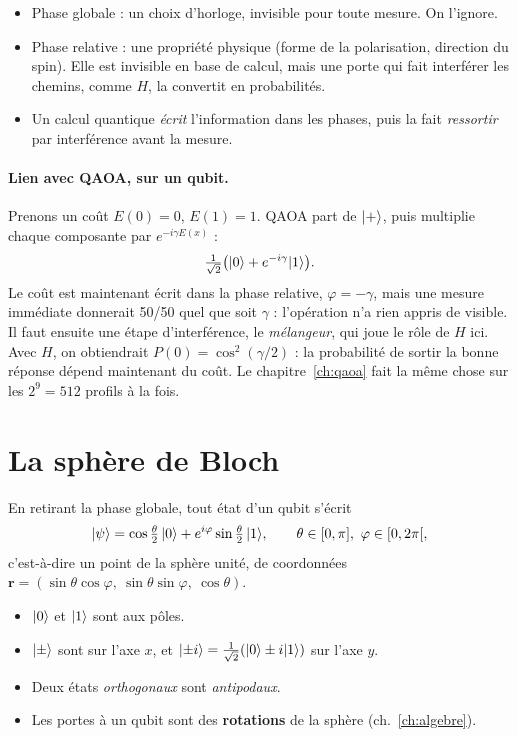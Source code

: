 \begin{resultat}
\begin{itemize}
\item Phase globale : un choix d'horloge, invisible pour toute mesure. On l'ignore.
\item Phase relative : une propriété physique (forme de la polarisation, direction du spin). Elle est invisible en base de calcul, mais une porte qui fait interférer les chemins, comme $H$, la convertit en probabilités.
\item Un calcul quantique \emph{écrit} l'information dans les phases, puis la fait \emph{ressortir} par interférence avant la mesure.
\end{itemize}
\end{resultat}

\paragraph{Lien avec QAOA, sur un qubit.} Prenons un coût $E(0)=0$, $E(1)=1$. QAOA part de $\lvert +\rangle$, puis multiplie chaque composante par $e^{-i\gamma E(x)}$ :
\[
\tfrac1{\sqrt2}\big(\lvert 0\rangle+e^{-i\gamma}\lvert 1\rangle\big).
\]
Le coût est maintenant écrit dans la phase relative, $\varphi=-\gamma$, mais une mesure immédiate donnerait 50/50 quel que soit $\gamma$ : l'opération n'a rien appris de visible. Il faut ensuite une étape d'interférence, le \emph{mélangeur}, qui joue le rôle de $H$ ici. Avec $H$, on obtiendrait $P(0)=\cos^2(\gamma/2)$ : la probabilité de sortir la bonne réponse dépend maintenant du coût. Le chapitre~\ref{ch:qaoa} fait la même chose sur les $2^9=512$ profils à la fois.

\section{La sphère de Bloch}
En retirant la phase globale, tout état d'un qubit s'écrit
\[
\lvert \psi\rangle=\cos\tfrac\theta2\,\lvert 0\rangle+e^{i\varphi}\sin\tfrac\theta2\,\lvert 1\rangle,\qquad \theta\in[0,\pi],\ \varphi\in[0,2\pi[,
\]
c'est-à-dire un point de la sphère unité, de coordonnées $\mathbf r=(\sin\theta\cos\varphi,\ \sin\theta\sin\varphi,\ \cos\theta)$.
\begin{itemize}
\item $\lvert 0\rangle$ et $\lvert 1\rangle$ sont aux pôles.
\item $\lvert \pm\rangle$ sont sur l'axe $x$, et $\lvert \pm i\rangle=\tfrac1{\sqrt2}(\lvert 0\rangle\pm i\lvert 1\rangle)$ sur l'axe $y$.
\item Deux états \emph{orthogonaux} sont \emph{antipodaux}.
\item Les portes à un qubit sont des \textbf{rotations} de la sphère (ch.~\ref{ch:algebre}).
\end{itemize}

